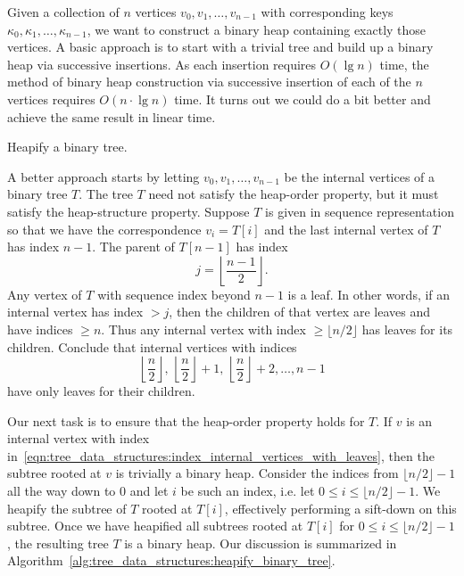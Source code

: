 Given a collection of $n$ vertices $v_0, v_1, \dots, v_{n-1}$ with
corresponding keys $\kappa_0, \kappa_1, \dots, \kappa_{n-1}$, we want
to construct a binary heap containing exactly those vertices. A basic
approach is to start with a trivial tree and build up a binary heap
via successive insertions. As each insertion requires $O(\lg n)$ time,
the method of binary heap construction via successive insertion of
each of the $n$ vertices requires $O(n \cdot \lg n)$ time. It turns
out we could do a bit better and achieve the same result in linear
time.

\begin{algorithm}[!htbp]

\caption{Heapify a binary tree.}
\label{alg:tree_data_structures:heapify_binary_tree}
\end{algorithm}

A better approach starts by letting $v_0, v_1, \dots, v_{n-1}$ be the
internal vertices of a binary tree $T$. The tree $T$ need not satisfy
the heap-order property, but it must satisfy the heap-structure
property. Suppose $T$ is given in sequence representation so that we
have the correspondence $v_i = T[i]$ and the last internal vertex of
$T$ has index $n - 1$. The parent of $T[n-1]$ has index
\[
j
=
\left\lfloor \frac{n - 1}{2} \right\rfloor.
\]
Any vertex of $T$ with sequence index beyond $n - 1$ is a leaf. In
other words, if an internal vertex has index $> j$, then the children
of that vertex are leaves and have indices $\geq n$. Thus any internal
vertex with index $\geq \lfloor n/2 \rfloor$ has leaves for its
children. Conclude that internal vertices with indices
\begin{equation}
\label{eqn:tree_data_structures:index_internal_vertices_with_leaves}
\left\lfloor \frac{n}{2} \right\rfloor,\,
\left\lfloor \frac{n}{2} \right\rfloor + 1,\,
\left\lfloor \frac{n}{2} \right\rfloor + 2,
\dots,
n - 1
\end{equation}
have only leaves for their children.

Our next task is to ensure that the heap-order property holds for
$T$. If $v$ is an internal vertex with index
in~\eqref{eqn:tree_data_structures:index_internal_vertices_with_leaves},
then the subtree rooted at $v$ is trivially a binary heap. Consider
the indices from $\lfloor n / 2 \rfloor - 1$ all the way down to
$0$ and let $i$ be such an index, i.e. let
$0 \leq i \leq \lfloor n / 2 \rfloor - 1$. We heapify the subtree of
$T$ rooted at $T[i]$, effectively performing a sift-down on this
subtree. Once we have heapified all subtrees rooted at $T[i]$ for
$0 \leq i \leq \lfloor n / 2 \rfloor - 1$, the resulting tree $T$ is a
binary heap. Our discussion is summarized in
Algorithm~\ref{alg:tree_data_structures:heapify_binary_tree}.

